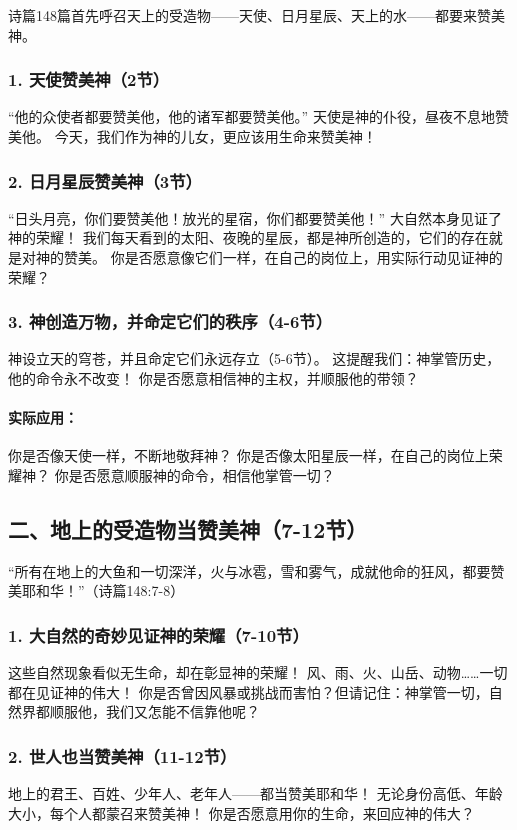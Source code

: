 \documentclass[a4paper, 12pt]{article}
\begin{document}
诗篇148篇首先呼召天上的受造物——天使、日月星辰、天上的水——都要来赞美神。

\subsubsection*{1. 天使赞美神（2节）}
“他的众使者都要赞美他，他的诸军都要赞美他。”
天使是神的仆役，昼夜不息地赞美他。
今天，我们作为神的儿女，更应该用生命来赞美神！
\subsubsection*{2. 日月星辰赞美神（3节）}
“日头月亮，你们要赞美他！放光的星宿，你们都要赞美他！”
大自然本身见证了神的荣耀！ 我们每天看到的太阳、夜晚的星辰，都是神所创造的，它们的存在就是对神的赞美。
你是否愿意像它们一样，在自己的岗位上，用实际行动见证神的荣耀？
\subsubsection*{3. 神创造万物，并命定它们的秩序（4-6节）}
神设立天的穹苍，并且命定它们永远存立（5-6节）。
这提醒我们：神掌管历史，他的命令永不改变！
你是否愿意相信神的主权，并顺服他的带领？
\paragraph*{实际应用：}
你是否像天使一样，不断地敬拜神？
你是否像太阳星辰一样，在自己的岗位上荣耀神？
你是否愿意顺服神的命令，相信他掌管一切？
\subsection*{二、地上的受造物当赞美神（7-12节）}
“所有在地上的大鱼和一切深洋，火与冰雹，雪和雾气，成就他命的狂风，都要赞美耶和华！”（诗篇148:7-8）

\subsubsection*{1. 大自然的奇妙见证神的荣耀（7-10节）}

这些自然现象看似无生命，却在彰显神的荣耀！
风、雨、火、山岳、动物……一切都在见证神的伟大！
你是否曾因风暴或挑战而害怕？但请记住：神掌管一切，自然界都顺服他，我们又怎能不信靠他呢？
\subsubsection*{2. 世人也当赞美神（11-12节）}

地上的君王、百姓、少年人、老年人——都当赞美耶和华！
无论身份高低、年龄大小，每个人都蒙召来赞美神！
你是否愿意用你的生命，来回应神的伟大？
\end{document}

